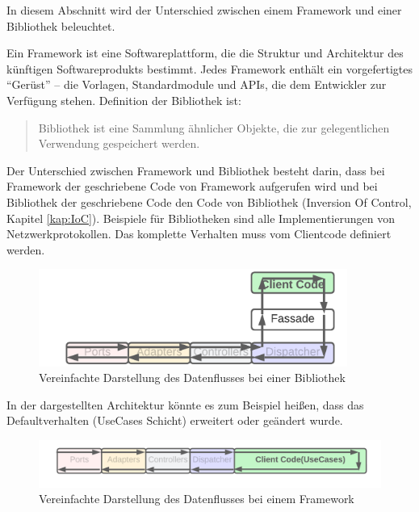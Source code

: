 In diesem Abschnitt wird der Unterschied zwischen einem Framework und einer Bibliothek beleuchtet.

Ein Framework ist eine Softwareplattform, die die Struktur und Architektur des künftigen Softwareprodukts bestimmt.
Jedes Framework enthält ein vorgefertigtes “Gerüst” – die Vorlagen, Standardmodule und APIs, 
die dem Entwickler zur Verfügung stehen.
\footnotemark
{}
Definition der Bibliothek ist:
\begin{quote}
    Bibliothek ist eine Sammlung ähnlicher Objekte, die zur gelegentlichen Verwendung gespeichert werden.\footnotemark
\end{quote}

Der Unterschied zwischen Framework und Bibliothek besteht darin, 
dass bei Framework der geschriebene Code von Framework aufgerufen wird 
und bei Bibliothek der geschriebene Code den Code von Bibliothek  (Inversion Of Control, Kapitel \ref{kap:IoC}).
\footnotemark
{}
Beispiele für Bibliotheken sind alle Implementierungen von Netzwerkprotokollen.
Das komplette Verhalten muss vom Clientcode definiert werden.

\begin{figure}[H]
    \centering
    \includegraphics[width=0.9\textwidth]{./images/Dataflow Library.png}
    \caption{Vereinfachte Darstellung des Datenflusses bei einer Bibliothek}
    \label{fig:SimpliedDataflowLibrary}
\end{figure}

In der dargestellten Architektur könnte es zum Beispiel heißen, 
dass das Defaultverhalten (UseCases Schicht) erweitert oder geändert wurde.

\begin{figure}[H]
    \centering
    \includegraphics[width=1\textwidth]{./images/Dataflow Framework.png}
    \caption{Vereinfachte Darstellung des Datenflusses bei einem Framework}
    \label{fig:SimpliedDataflowFramework}
\end{figure}

